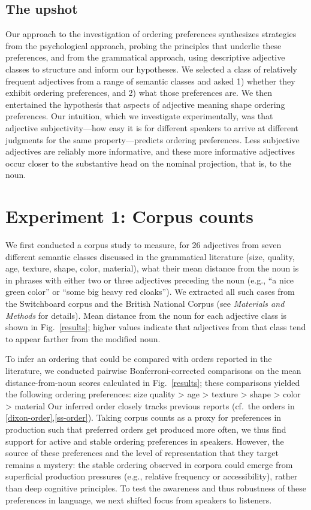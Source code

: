 \documentclass{pnastwo}
\begin{document}
\begin{article}
\subsection{The upshot} Our approach to the investigation of ordering preferences synthesizes strategies from the psychological approach, probing the principles that underlie these preferences, and from the grammatical approach, using descriptive adjective classes to structure and inform our hypotheses. We selected a class of relatively frequent adjectives from a range of semantic classes and asked 1) whether they exhibit ordering preferences, and 2) what those preferences are. We then entertained the hypothesis that aspects of adjective meaning shape ordering preferences. Our intuition, which we investigate experimentally, was that adjective subjectivity---how easy it is for different speakers to arrive at different judgments for the same property---predicts ordering preferences. Less subjective adjectives are reliably more informative, and these more informative adjectives occur closer to the substantive head on the nominal projection, that is, to the noun.

\section{Experiment 1: Corpus counts}

We first conducted a corpus study to measure, for 26 adjectives from seven different semantic classes discussed in the grammatical literature (size, quality, age, texture, shape, color, material), what their mean distance from the noun is in phrases with either two or three adjectives preceding the noun (e.g., ``a nice green color'' or ``some big heavy red cloaks''). We extracted all such cases from the Switchboard corpus and the British National Corpus (see \emph{Materials and Methods} for details). Mean distance from the noun for each adjective class is shown in Fig.~\ref{results}; higher values indicate that adjectives from that class tend to appear farther from the modified noun.

To infer an ordering that could be compared with orders reported in the literature, we conducted pairwise Bonferroni-corrected comparisons on the mean distance-from-noun scores calculated in Fig.~\ref{results}; these comparisons yielded the following ordering preferences:
\be size \geq quality > age > texture > shape > color > material \label{inferred-order-preferences}\ee
Our inferred order closely tracks previous reports (cf.~the orders in \ref{dixon-order},\ref{ss-order}). Taking corpus counts as a proxy for preferences in production such that preferred orders get produced more often, we thus find support for active and stable ordering preferences in speakers. However, the source of these preferences and the level of representation that they target remains a mystery: the stable ordering observed in corpora could emerge from superficial production pressures (e.g., relative frequency or accessibility), rather than deep cognitive principles. To test the awareness and thus robustness of these preferences in language, we next shifted focus from speakers to listeners.


\end{article}
\end{document}
